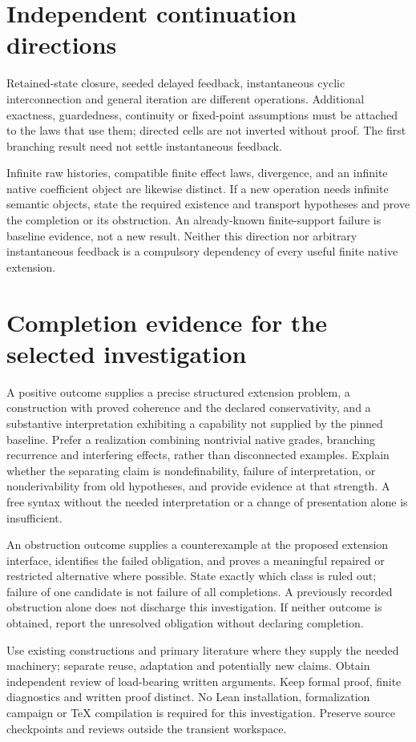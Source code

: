 \documentclass[11pt]{article}
\begin{document}
\section{Independent continuation directions}
Retained-state closure, seeded delayed feedback, instantaneous cyclic interconnection and general iteration are different operations. Additional exactness, guardedness, continuity or fixed-point assumptions must be attached to the laws that use them; directed cells are not inverted without proof. The first branching result need not settle instantaneous feedback.

Infinite raw histories, compatible finite effect laws, divergence, and an infinite native coefficient object are likewise distinct. If a new operation needs infinite semantic objects, state the required existence and transport hypotheses and prove the completion or its obstruction. An already-known finite-support failure is baseline evidence, not a new result. Neither this direction nor arbitrary instantaneous feedback is a compulsory dependency of every useful finite native extension.

\section{Completion evidence for the selected investigation}
A positive outcome supplies a precise structured extension problem, a construction with proved coherence and the declared conservativity, and a substantive interpretation exhibiting a capability not supplied by the pinned baseline. Prefer a realization combining nontrivial native grades, branching recurrence and interfering effects, rather than disconnected examples. Explain whether the separating claim is nondefinability, failure of interpretation, or nonderivability from old hypotheses, and provide evidence at that strength. A free syntax without the needed interpretation or a change of presentation alone is insufficient.

An obstruction outcome supplies a counterexample at the proposed extension interface, identifies the failed obligation, and proves a meaningful repaired or restricted alternative where possible. State exactly which class is ruled out; failure of one candidate is not failure of all completions. A previously recorded obstruction alone does not discharge this investigation. If neither outcome is obtained, report the unresolved obligation without declaring completion.

Use existing constructions and primary literature where they supply the needed machinery; separate reuse, adaptation and potentially new claims. Obtain independent review of load-bearing written arguments. Keep formal proof, finite diagnostics and written proof distinct. No Lean installation, formalization campaign or TeX compilation is required for this investigation. Preserve source checkpoints and reviews outside the transient workspace.
\end{document}
